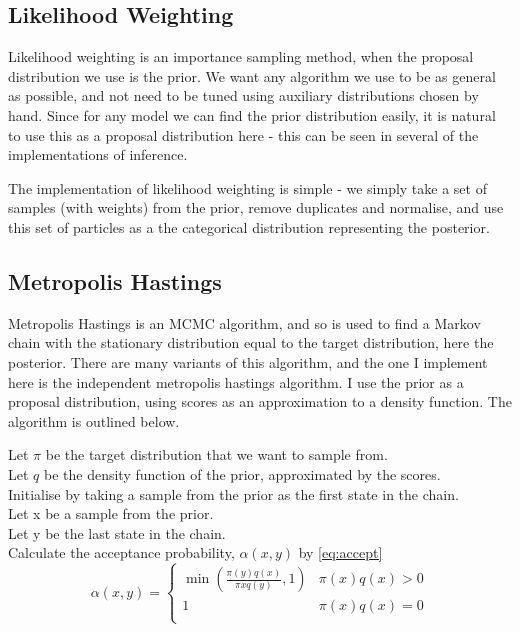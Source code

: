 	
\subsection{Likelihood Weighting} \label{sec:likelihood-wighting}
	
Likelihood weighting is an importance sampling method, when the proposal distribution we use is the prior. We want any algorithm we use to be as general as possible, and not need to be tuned using auxiliary distributions chosen by hand. Since for any model we can find the prior distribution easily, it is natural to use this as a proposal distribution here - this can be seen in several of the implementations of inference. 
	
The implementation of likelihood weighting is simple - we simply take a set of samples (with weights) from the prior, remove duplicates and normalise, and use this set of particles as a the categorical distribution representing the posterior. 
	
	
\subsection{Metropolis Hastings} \label{sec:mh}
Metropolis Hastings is an MCMC algorithm, and so is used to find a Markov chain with the stationary distribution equal to the target distribution, here the posterior. There are many variants of this algorithm, and the one I implement here is the independent metropolis hastings algorithm. I use the prior as a proposal distribution, using scores as an approximation to a density function. The algorithm is outlined below.

Let $\pi$ be the target distribution that we want to sample from.\\
Let $q$ be the density function of the prior, approximated by the scores.\\
Initialise by taking a sample from the prior as the first state in the chain.\\
Let x be a sample from the prior.\\
Let y be the last state in the chain.\\
Calculate the acceptance probability, $\alpha(x,y)$ by \eqref{eq:accept}
\begin{equation}
	\label{eq:accept}
	\alpha(x,y) = 
	\begin{cases}	
		\min{\left( \frac{\pi(y)q(x)}{\pi{x}q(y)},1 \right) } & \pi(x)q(x) > 0 \\
		1                                                     & \pi(x)q(x) = 0 \\
	\end{cases}
\end{equation}

